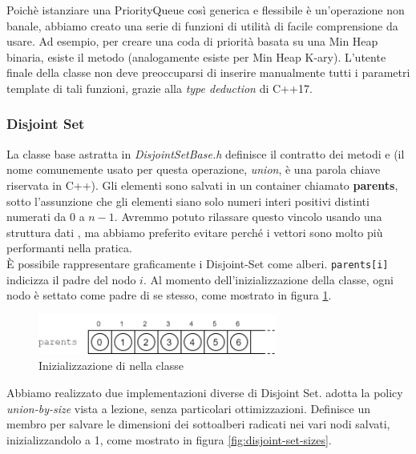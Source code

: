 \noindent Poichè istanziare una PriorityQueue così generica e flessibile è un'operazione non banale, abbiamo creato una serie di funzioni di utilità di facile comprensione da usare. Ad esempio, per creare una coda di priorità basata su una Min Heap binaria, esiste il metodo  (analogamente esiste  per Min Heap K-ary).
L'utente finale della classe non deve preoccuparsi di inserire manualmente tutti i parametri template di tali funzioni, grazie alla \textit{type deduction} di C++17.

\subsubsection{Disjoint Set}

La classe base astratta in \textit{DisjointSetBase.h} definisce il contratto dei metodi  e  (il nome comunemente usato per questa operazione, \textit{union}, è una parola chiave riservata in C++).
Gli elementi sono salvati in un container  chiamato \textbf{parents}, sotto l'assunzione che gli elementi siano solo numeri interi positivi distinti numerati da $0$ a $n-1$.
Avremmo potuto rilassare questo vincolo usando una struttura dati , ma abbiamo preferito evitare perché i vettori sono molto più performanti nella pratica. \\

\noindent È possibile rappresentare graficamente i Disjoint-Set come alberi.
\texttt{parents[i]} indicizza il padre del nodo $i$. Al momento dell'inizializzazione della classe, ogni nodo è settato come padre di se stesso, come mostrato in figura \ref{fig:disjoint-set-base-parents}.

\begin{figure}[htbp]
	\centering
	\includegraphics[width=0.7\textwidth]{./images/DisjointSetParentsVector.png}
	\caption{Inizializzazione di  nella classe }
	\label{fig:disjoint-set-base-parents}
\end{figure}

\noindent Abbiamo realizzato due implementazioni diverse di Disjoint Set.
 adotta la policy \textit{union-by-size} vista a lezione, senza particolari ottimizzazioni. Definisce un membro  per salvare le dimensioni dei sottoalberi radicati nei vari nodi salvati, inizializzandolo a 1, come mostrato in figura \ref{fig:disjoint-set-sizes}.

